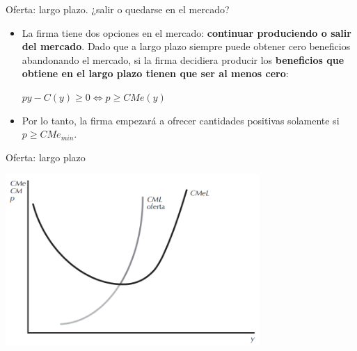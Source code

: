 \documentclass{beamer}
\theoremstyle{definition}
\begin{document}
\begin{frame}{Oferta: largo plazo. ¿salir o quedarse en el mercado?}
\begin{itemize}
\item  La firma tiene dos opciones en el mercado: \textbf{continuar produciendo o salir del mercado}. Dado que a largo plazo siempre puede obtener
cero beneficios abandonando el mercado, si la firma decidiera producir los \textbf{beneficios que obtiene en el
largo plazo tienen que ser al menos cero}:
\begin{center}
$py-C(y)\geq 0 \Leftrightarrow p\geq CMe(y)$
\end{center}
\item Por lo tanto, la firma empezará a ofrecer cantidades positivas solamente si $p\geq CMe_{min}$. %
\end{itemize}
\end{frame}

\begin{frame}{Oferta: largo plazo}
\begin{center}
\includegraphics[width=3.8in]{figures4/cmgLP.png}
\end{center}
\end{frame}
\end{document}
